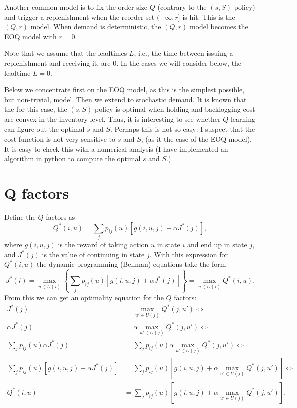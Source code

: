 \documentclass{article}
\begin{document}
Another common model is to fix the order size $Q$ (contrary to the $(s,S)$ policy) and trigger a replenishment when the reorder set $(-\infty, r]$ is hit. This is the $(Q,r)$ model. When demand is deterministic, the $(Q,r)$ model becomes the EOQ model with $r=0$. 

Note that we assume that the leadtimes $L$, i.e., the time between issuing a replenishment and receiving it, are $0$.  In the cases we will consider below, the leadtime $L=0$. 

Below we concentrate first on the EOQ model, as this is the simplest possible, but non-trivial, model. Then we extend to stochastic demand. It is known that the for this case, the $(s,S)$-policy is optimal when holding and backlogging cost are convex in the inventory level. Thus, it is interesting to see whether $Q$-learning can figure out the optimal $s$ and $S$. Perhaps this is not so easy: I suspect that the cost function is not very sensitive to $s$ and $S$, (as it the case of the EOQ model). It is easy to check this with a numerical analysis (I have implemented an algorithm in python to compute the optimal $s$ and $S$.)

\section{Q factors}
\label{sec:q-factors}


Define the $Q$-factors
as
\begin{equation*}
  Q^*(i,u) = \sum_{j} p_{ij}(u)\left[g(i,u, j) + \alpha J^*(j)\right],
\end{equation*}
where $g(i, u, j)$ is the reward of taking action $u$ in state $i$ and end up in state $j$, and $J^*(j)$ is the value of continuing in state $j$. 
With this expression for $Q^*(i,u)$ the dynamic programming (Bellman) equations take the form
\begin{equation*}
  J^*(i) 
= \max_{u\in U(i)}\left\{\sum_{j} p_{ij}(u)\left[g(i,u, j) + \alpha J^*(j)\right]\right\}
= \max_{u\in U(i)} Q^*(i,u).
\end{equation*}
From this we can get an optimality equation for  the $Q$ factors:
\begin{align*}
  J^*(j) &= \max_{u'\in U(j)} Q^*(j,u') \iff \\
\alpha J^*(j) &=   \alpha \max_{u'\in U(j)} Q^*(j,u') \iff \\
  \sum_{j} p_{ij}(u) \alpha J^*(j) &=   \sum_{j} p_{ij}(u) \alpha \max_{u'\in U(j)} Q^*(j,u') \iff \\
  \sum_{j} p_{ij}(u)\left[g(i,u,j) +  \alpha J^*(j)\right] &=   \sum_{j} p_{ij}(u) \left[g(i,u,j) + \alpha \max_{u'\in U(j)} Q^*(j,u')\right] \iff \\
  Q^*(i,u) &=   \sum_{j} p_{ij}(u) \left[g(i,u,j) + \alpha \max_{u'\in U(j)} Q^*(j,u')\right].
\end{align*}
\end{document}
